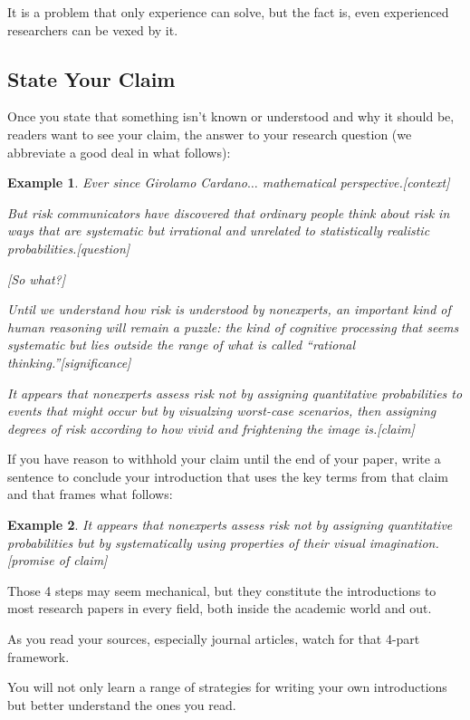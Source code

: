 \documentclass[oneside]{book}
\numberwithin{equation}{section}
\newtheorem{example}{Example}[section]
\begin{document}
It is a problem that only experience can solve, but the fact is, even experienced researchers can be vexed by it.

\subsection{State Your Claim}
Once you state that something isn't known or understood and why it should be, readers want to see your claim, the answer to your research question (we abbreviate a good deal in what follows):
\begin{example}
    Ever since Girolamo Cardano$\ldots$ mathematical perspective.\emph{[context]}
    
    But risk communicators have discovered that ordinary people think about risk in ways that are systematic but irrational and unrelated to statistically realistic probabilities.\emph{[question]}
    
    \emph{[So what?]}
    
    Until we understand how risk is understood by nonexperts, an important kind of human reasoning will remain a puzzle: the kind of cognitive processing that seems systematic but lies outside the range of what is called ``rational thinking.''\emph{[significance]}
    
    It appears that nonexperts assess risk not by assigning quantitative probabilities to events that might occur but by visualzing worst-case scenarios, then assigning degrees of risk according to how vivid and frightening the image is.\emph{[claim]}
\end{example}
If you have reason to withhold your claim until the end of your paper, write a sentence to conclude your introduction that uses the key terms from that claim and that frames what follows:
\begin{example}
    It appears that nonexperts assess risk not by assigning quantitative probabilities but by systematically using properties of their visual imagination.\emph{[promise of claim]}
\end{example}
Those 4 steps may seem mechanical, but they constitute the introductions to most research papers in every field, both inside the academic world and out.

As you read your sources, especially journal articles, watch for that 4-part framework.

You will not only learn a range of strategies for writing your own introductions but better understand the ones you read.
\end{document}
